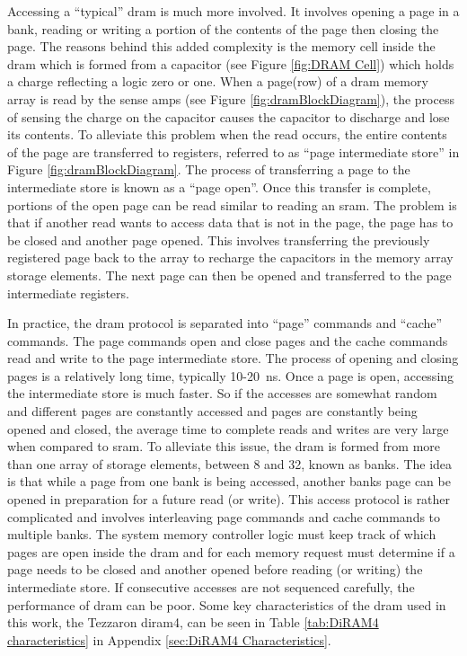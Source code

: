 Accessing a ``typical'' \ac{dram} is much more involved. It involves opening a page in a bank, reading or writing a portion of the contents of the page then closing the page. 
The reasons behind this added complexity is the memory cell inside the \ac{dram} which is formed from a capacitor (see Figure \ref{fig:DRAM Cell}) which holds a charge reflecting a logic zero or one. 
When a page(row) of a \ac{dram} memory array is read by the sense amps (see Figure \ref{fig:dramBlockDiagram}), the process of sensing the charge on the capacitor causes the capacitor to discharge and lose its contents. 
To alleviate this problem \iffalse \ac{dram} arrays are formed from a column of storage elements known as a page. \fi when the read occurs, the entire contents of the page are transferred to registers, referred to as ``page intermediate store'' in Figure \ref{fig:dramBlockDiagram}. 
The process of transferring a page to the intermediate store is known as a ``page open''.
Once this transfer is complete, portions of the open page can be read similar to reading an \ac{sram}. 
The problem is that if another read wants to access data that is not in the page, the page has to be closed and another page opened. 
This involves transferring the previously registered page back to the array to recharge the capacitors in the memory array storage elements. 
The next page can then be opened and transferred to the page intermediate registers.

In practice, the \ac{dram} protocol is separated into ``page'' commands and ``cache'' commands. The page commands open and close pages and the cache commands read and write to the page intermediate store.
The process of opening and closing pages is a relatively long time, typically 10-20\SI[per-mode=symbol]{}{\nano\second}. Once a page is open, accessing the intermediate store is much faster.
So if the accesses are somewhat random and different pages are constantly accessed and pages are constantly being opened and closed, the average time to complete reads and writes are very large when compared to \ac{sram}.
To alleviate this issue, the \ac{dram} is formed from more than one array of storage elements, between 8 and 32, known as banks. The idea is that while a page from one bank is being accessed, another banks page can be opened in preparation for a future read (or write).
This access protocol is rather complicated and involves interleaving page commands and cache commands to multiple banks. 
The system memory controller logic must keep track of which pages are open inside the \ac{dram} and for each memory request must determine if a page needs to be closed and another opened before reading (or writing) the intermediate store.
If consecutive accesses are not sequenced carefully, the performance of \ac{dram} can be poor.
Some key characteristics of the \ac{dram} used in this work, the Tezzaron \ac{diram4}, can be seen in Table \ref{tab:DiRAM4 characteristics} in Appendix \ref{sec:DiRAM4 Characteristics}. 


